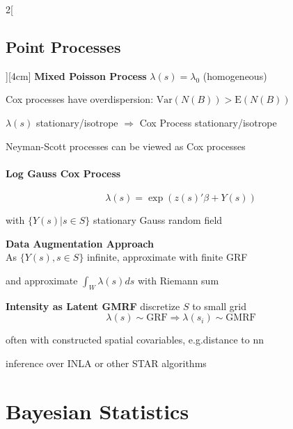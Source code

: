 \documentclass[8pt]{extarticle}
\begin{document}
\begin{multicols}{2}[\subsection{Point Processes}][4cm]
\textbf{Mixed Poisson Process} $\lambda(s)=\lambda_0$ (homogeneous)

\noindent Cox processes have overdispersion: $\mathrm{Var}(N(B)) > \mathrm{E}(N(B))$

\noindent $\lambda(s)$ stationary/isotrope $\Rightarrow$ Cox Process stationary/isotrope

\noindent Neyman-Scott processes can be viewed as Cox processes


\paragraph{Log Gauss Cox Process}

$$\lambda(s)=\exp(z(s)'\beta + Y(s))$$

\noindent with $\{Y(s)|s\in S\}$ stationary Gauss random field

\textbf{Data Augmentation Approach} \ \\ 
As $\{Y(s),s\in S\}$ infinite, approximate with finite GRF

and approximate $\int_W \lambda(s)ds$ with Riemann sum

\textbf{Intensity as Latent GMRF} discretize $S$ to small grid
$$\lambda(s) \sim \mathrm{GRF} \Rightarrow \lambda(s_i) \sim \mathrm{GMRF}$$

often with constructed spatial covariables, e.g.\@ distance to nn

inference over INLA or other STAR algorithms

\end{multicols}



\section{Bayesian Statistics}
\end{document}
